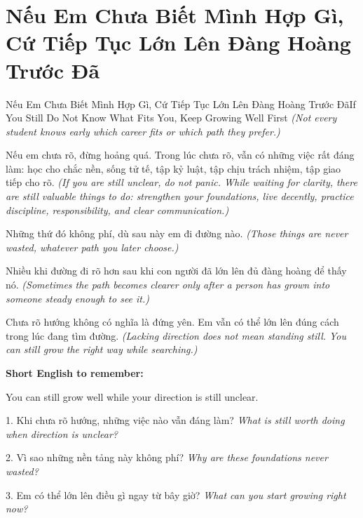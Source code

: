 \section{Nếu Em Chưa Biết Mình Hợp Gì, Cứ Tiếp Tục Lớn Lên Đàng Hoàng Trước Đã}
\begin{truyen}{Nếu Em Chưa Biết Mình Hợp Gì, Cứ Tiếp Tục Lớn Lên Đàng Hoàng Trước Đã}{If You Still Do Not Know What Fits You, Keep Growing Well First}
\textit{(Not every student knows early which career fits or which path they prefer.)}

Nếu em chưa rõ, đừng hoảng quá. Trong lúc chưa rõ, vẫn có những việc rất đáng làm: học cho chắc nền, sống tử tế, tập kỷ luật, tập chịu trách nhiệm, tập giao tiếp cho rõ.
\textit{(If you are still unclear, do not panic. While waiting for clarity, there are still valuable things to do: strengthen your foundations, live decently, practice discipline, responsibility, and clear communication.)}

Những thứ đó không phí, dù sau này em đi đường nào.
\textit{(Those things are never wasted, whatever path you later choose.)}

Nhiều khi đường đi rõ hơn sau khi con người đã lớn lên đủ đàng hoàng để thấy nó.
\textit{(Sometimes the path becomes clearer only after a person has grown into someone steady enough to see it.)}
\end{truyen}

\begin{baihoc}
Chưa rõ hướng không có nghĩa là đứng yên. Em vẫn có thể lớn lên đúng cách trong lúc đang tìm đường.
\textit{(Lacking direction does not mean standing still. You can still grow the right way while searching.)}
\end{baihoc}

\begin{ghinhoanh}
\textbf{Short English to remember:}

You can still grow well while your direction is still unclear.

\end{ghinhoanh}

\begin{tuhocnhanh}
1. Khi chưa rõ hướng, những việc nào vẫn đáng làm? \textit{What is still worth doing when direction is unclear?}

2. Vì sao những nền tảng này không phí? \textit{Why are these foundations never wasted?}

3. Em có thể lớn lên điều gì ngay từ bây giờ? \textit{What can you start growing right now?}
\end{tuhocnhanh}
\ngancach

